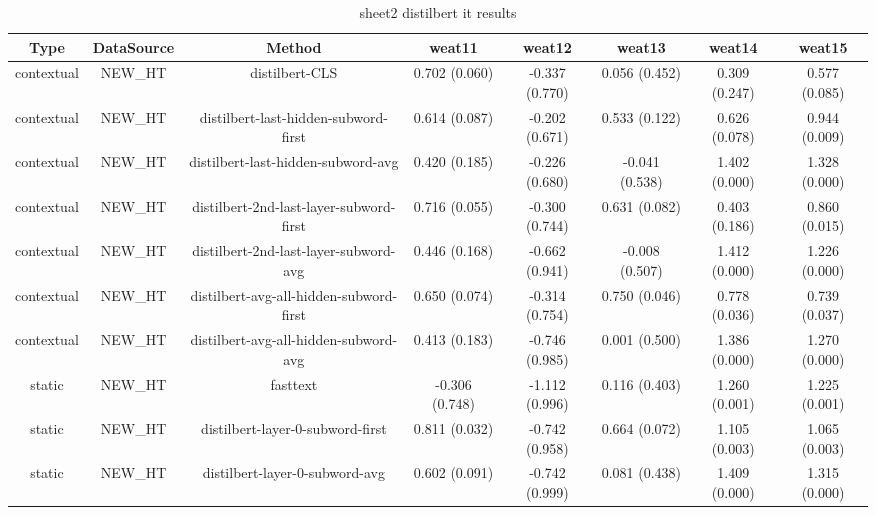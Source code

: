 \begin{sidewaystable}[htb]
    \centering
    \caption{sheet2 distilbert it results}
    \label{appendix_tab:sheet2_distilbert_it_results}
    \small
    \begin{tabular}{@{}cccccccc@{}}
        \toprule
        Type & DataSource & Method & weat11 & weat12 & weat13 & weat14 & weat15 \\
        \midrule
        contextual & NEW\_HT & distilbert-CLS & 0.702 (0.060) & -0.337 (0.770) & 0.056 (0.452) & 0.309 (0.247) & 0.577 (0.085) \\
        contextual & NEW\_HT & distilbert-last-hidden-subword-first & 0.614 (0.087) & -0.202 (0.671) & 0.533 (0.122) & 0.626 (0.078) & 0.944 (0.009) \\
        contextual & NEW\_HT & distilbert-last-hidden-subword-avg & 0.420 (0.185) & -0.226 (0.680) & -0.041 (0.538) & 1.402 (0.000) & 1.328 (0.000) \\
        contextual & NEW\_HT & distilbert-2nd-last-layer-subword-first & 0.716 (0.055) & -0.300 (0.744) & 0.631 (0.082) & 0.403 (0.186) & 0.860 (0.015) \\
        contextual & NEW\_HT & distilbert-2nd-last-layer-subword-avg & 0.446 (0.168) & -0.662 (0.941) & -0.008 (0.507) & 1.412 (0.000) & 1.226 (0.000) \\
        contextual & NEW\_HT & distilbert-avg-all-hidden-subword-first & 0.650 (0.074) & -0.314 (0.754) & 0.750 (0.046) & 0.778 (0.036) & 0.739 (0.037) \\
        contextual & NEW\_HT & distilbert-avg-all-hidden-subword-avg & 0.413 (0.183) & -0.746 (0.985) & 0.001 (0.500) & 1.386 (0.000) & 1.270 (0.000) \\
        static & NEW\_HT & fasttext & -0.306 (0.748) & -1.112 (0.996) & 0.116 (0.403) & 1.260 (0.001) & 1.225 (0.001) \\
        static & NEW\_HT & distilbert-layer-0-subword-first & 0.811 (0.032) & -0.742 (0.958) & 0.664 (0.072) & 1.105 (0.003) & 1.065 (0.003) \\
        static & NEW\_HT & distilbert-layer-0-subword-avg & 0.602 (0.091) & -0.742 (0.999) & 0.081 (0.438) & 1.409 (0.000) & 1.315 (0.000) \\
        \bottomrule
    \end{tabular}
\end{sidewaystable}